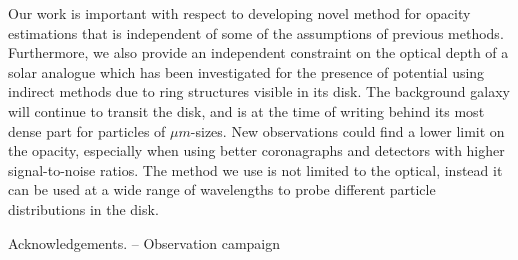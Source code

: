 \documentclass{aa}
\begin{document}
Our work is important with respect to developing novel method for opacity estimations that is independent of some of the assumptions of previous methods. Furthermore, we also provide an independent constraint on the optical depth of a solar analogue which has been investigated for the presence of potential using indirect methods due to ring structures visible in its disk. The background galaxy will continue to transit the disk, and is at the time of writing behind its most dense part for particles of $\mu m$-sizes. New observations could find a lower limit on the opacity, especially when using better coronagraphs and detectors with higher signal-to-noise ratios. The method we use is not limited to the optical, instead it can be used at a wide range of wavelengths to probe different particle distributions in the disk.


% 
% 
% 
% 
% 
% 


\begin{acknowledgements}
    Acknowledgements. -- Observation campaign
\end{acknowledgements}





\begin{appendix}

\end{appendix}
\end{document}
